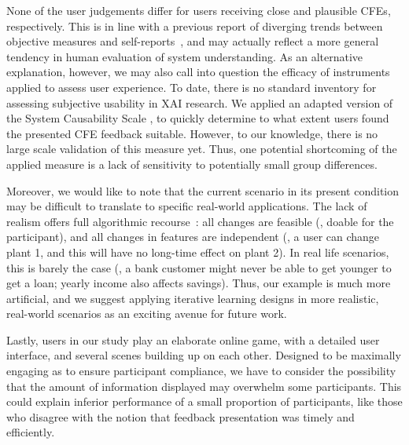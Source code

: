 {%
None of the user judgements differ for users receiving close and plausible \glspl{CFE}, respectively.
This is in line with a previous report of diverging trends between objective measures and self-reports~\citep{van_der_waa_evaluating_2021}, and may actually reflect a more general tendency in human evaluation of system understanding.
As an alternative explanation, however, we may also call into question the efficacy of instruments applied to assess user experience. 
To date, there is no standard inventory for assessing subjective usability in \gls{XAI} research.
We applied an adapted version of the System Causability Scale \cite{holzinger_measuring_2020}, to quickly determine to what extent users found the presented \gls{CFE} feedback suitable.
However, to our knowledge, there is no large scale validation of this measure yet.
Thus, one potential shortcoming of the applied measure is a lack of sensitivity to potentially small group differences.

Moreover, we would like to note that the current scenario in its present condition may be difficult to translate to specific real-world applications.
The lack of realism offers full algorithmic recourse~\citep{karimi_survey_2020}: all changes are feasible (\ie, doable for the participant), and all changes in features are independent (\ie, a user can change plant 1, and this will have no long-time effect on plant 2).
In real life scenarios, this is barely the case (\eg, a bank customer might never be able to get younger to get a loan; yearly income also affects savings). 
Thus, our example is much more artificial, and we suggest applying iterative learning designs in more realistic, real-world scenarios as an exciting avenue for future work.

Lastly, users in our study play an elaborate online game, with a detailed user interface, and several scenes building up on each other.
Designed to be maximally engaging as to ensure participant compliance, we have to consider the possibility that the amount of information displayed may overwhelm some participants.
This could explain inferior performance of a small proportion of participants, like those who disagree with the notion that feedback presentation was timely and efficiently.

}
